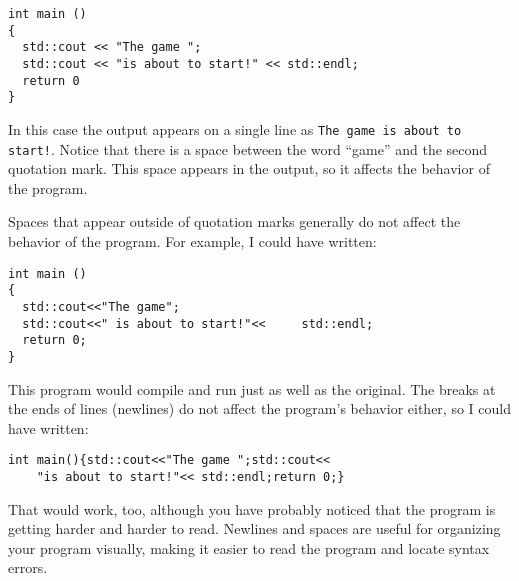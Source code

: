 \begin{lstlisting}[frame=single]
int main ()
{
  std::cout << "The game ";
  std::cout << "is about to start!" << std::endl;
  return 0
}
\end{lstlisting}

In this case the output appears on a single line as
{\tt The game is about to start!}.  Notice that there is a space
between the word ``game'' and the second quotation mark.
This space appears in the output, so it affects the behavior
of the program.

Spaces that appear outside of quotation marks generally do
not affect the behavior of the program.  For example, I
could have written:

\begin{lstlisting}[frame=single]
int main ()
{
  std::cout<<"The game";
  std::cout<<" is about to start!"<<     std::endl;
  return 0;
}
\end{lstlisting}

This program would compile and run just as well as the original.
The breaks at the ends of lines (newlines) do not affect
the program's behavior either, so I could have written:

\begin{lstlisting}[frame=single]
int main(){std::cout<<"The game ";std::cout<<
    "is about to start!"<< std::endl;return 0;}
\end{lstlisting}

That would work, too, although you have probably noticed that
the program is getting harder and harder to read.  Newlines and
spaces are useful for organizing your program visually, making
it easier to read the program and locate syntax errors.

